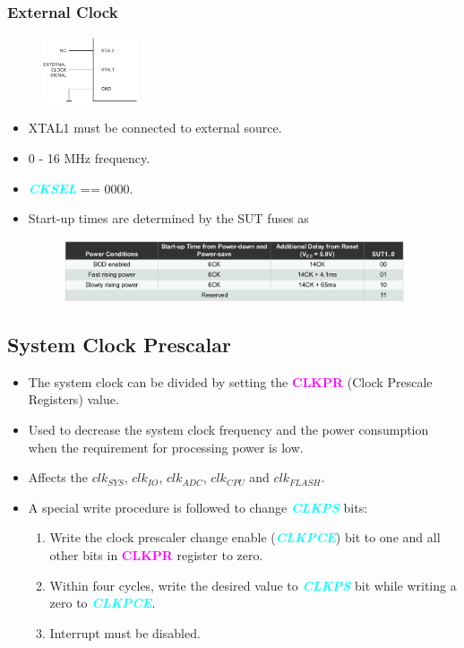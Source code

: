 \documentclass{article}
\newcommand{\bitFormat}[1]{\emph{\textbf{\textcolor{cyan}{#1}}}}
\newcommand{\regFormat}[1]{\textbf{\textcolor{magenta}{#1}}}
\begin{document}
\subsubsection{External Clock}
\begin{figure}[H]
    \begin{center}
        \includegraphics[width=0.25\textwidth]{externalClockciruit.png}
    \end{center}
\end{figure}
\begin{itemize}
    \item XTAL1 must be connected to external source.
    \item 0 - 16 MHz frequency.
    \item \bitFormat{CKSEL} == 0000.
    \item Start-up times are determined by the SUT fuses as
    \begin{figure}[H]
        \begin{center}
            \includegraphics[width=0.95\textwidth]{startUpTimeExternalClock.png}
        \end{center}
    \end{figure}
\end{itemize}

\subsection{System Clock Prescalar}
\begin{itemize}
    \item The system clock can be divided by setting the \regFormat{CLKPR} (Clock Prescale Registers) value.
    \item Used to decrease the system clock frequency and the power consumption when the requirement for processing power is low.
    \item Affects the $clk_{SYS}$, $clk_{IO}$, $clk_{ADC}$, $clk_{CPU}$ and $clk_{FLASH}$.
    \item A special write procedure is followed to change \bitFormat{CLKPS} bits:
    \begin{enumerate}[label=(\roman*)]
        \item Write the clock prescaler change enable (\bitFormat{CLKPCE}) bit to one and all other bits in \regFormat{CLKPR} register to zero.
        \item Within four cycles, write the desired value to \bitFormat{CLKPS} bit while writing a zero to \bitFormat{CLKPCE}.
        \item Interrupt must be disabled.
    \end{enumerate}
\end{itemize}
\end{document}
